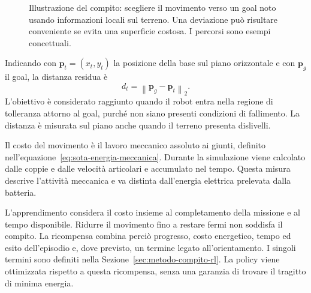 \begin{figure}[tbp]
    \centering
    \caption[Schema del problema di navigazione energetica]{Illustrazione del compito: scegliere il movimento verso un goal noto usando informazioni locali sul terreno. Una deviazione può risultare conveniente se evita una superficie costosa. I percorsi sono esempi concettuali.}
    \label{fig:metodo-problema-navigazione}
\end{figure}

Indicando con $\mathbf p_t=(x_t,y_t)$ la posizione della base sul piano orizzontale e con $\mathbf p_g$ il goal, la distanza residua è
\begin{equation}
    d_t=\left\|\mathbf p_g-\mathbf p_t\right\|_2.
    \label{eq:metodo-distanza-goal}
\end{equation}
L'obiettivo è considerato raggiunto quando il robot entra nella regione di tolleranza attorno al goal, purché non siano presenti condizioni di fallimento. La distanza è misurata sul piano anche quando il terreno presenta dislivelli.

Il costo del movimento è il lavoro meccanico assoluto ai giunti, definito nell'equazione~\eqref{eq:sota-energia-meccanica}. Durante la simulazione viene calcolato dalle coppie e dalle velocità articolari e accumulato nel tempo. Questa misura descrive l'attività meccanica e va distinta dall'energia elettrica prelevata dalla batteria.

L'apprendimento considera il costo insieme al completamento della missione e al tempo disponibile. Ridurre il movimento fino a restare fermi non soddisfa il compito. La ricompensa combina perciò progresso, costo energetico, tempo ed esito dell'episodio e, dove previsto, un termine legato all'orientamento. I singoli termini sono definiti nella Sezione~\ref{sec:metodo-compito-rl}. La policy viene ottimizzata rispetto a questa ricompensa, senza una garanzia di trovare il tragitto di minima energia.

